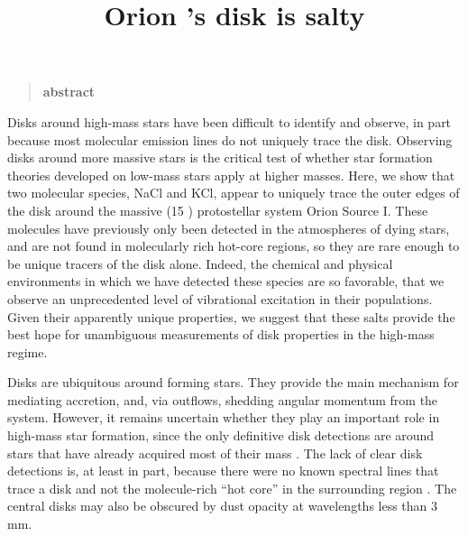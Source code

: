 \documentclass[12pt]{article}
\date{}
\title{Orion \sourcei's disk is salty}
\newenvironment{sciabstract}{%
\begin{quote} \bf  }
{\end{quote}}
\begin{document}

\baselineskip24pt


\maketitle 

\begin{sciabstract}
    abstract
\end{sciabstract}




Disks around high-mass stars have been difficult to identify and observe, in
part because most molecular emission lines do not uniquely trace the disk.
Observing disks around more massive stars is the critical test of whether star
formation theories developed on low-mass stars apply at higher masses.  Here,
we show that two molecular species, NaCl and KCl, appear to uniquely trace the
outer edges of the disk around the massive (15 \msun) protostellar system Orion
Source I. These molecules have previously only been detected in the atmospheres
of dying stars, and are not found in molecularly rich hot-core regions, so they
are rare enough to be unique tracers of the disk alone.  Indeed, the chemical
and physical environments in which we have detected these species are so
favorable, that we observe an unprecedented level of vibrational excitation in
their populations.    Given their apparently unique properties, we suggest that
these salts provide the best hope for unambiguous measurements of disk
properties in the high-mass regime.

Disks are ubiquitous around forming stars.  They provide the main mechanism for
mediating accretion, and, via outflows, shedding angular momentum from the system.
However, it remains uncertain whether they play an important role in high-mass
star formation, since the only definitive disk detections are around stars that
have already acquired most of their mass \citep{Girart2017a,Ginsburg2018b}.
The lack of clear disk detections is, at least in part, because there were no
known spectral lines that trace a disk and not the molecule-rich ``hot core''
in the surrounding region \citep{Goddi2018a,Cesaroni2017a}.  The central disks
may also be obscured by dust opacity at wavelengths less than 3 mm.
\end{document}
